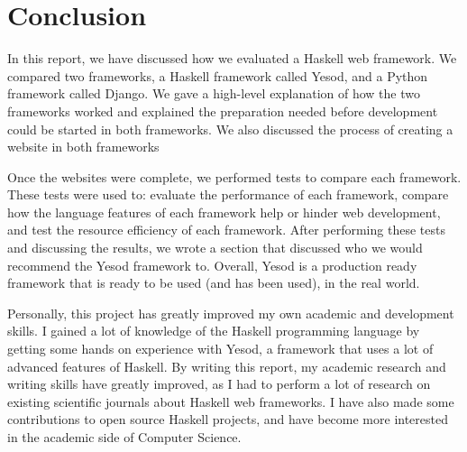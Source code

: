 \chapter{Conclusion}

In this report, we have discussed how we evaluated a
Haskell web framework. We compared two frameworks,
a Haskell framework called Yesod, and a Python
framework called Django. We gave a high-level explanation
of how the two frameworks worked and explained the preparation
needed before development could be started in both frameworks.
We also discussed the process of creating a website in
both frameworks

Once the websites were complete, we performed tests to compare
each framework. These tests were used to: evaluate the performance
of each framework, compare how the language features
of each framework help or hinder web development, and test
the resource efficiency of each framework. After performing
these tests and discussing the results, we wrote a section
that discussed who we would recommend the Yesod framework
to. Overall, Yesod is a production ready framework that is
ready to be used (and has been used), in the real world.

Personally, this project has greatly improved my own academic and
development skills. I gained a lot of knowledge of the Haskell
programming language by getting some hands on experience with
Yesod, a framework that uses a lot of advanced features of Haskell.
By writing this report, my academic
research and writing skills have greatly improved, as I had to
perform a lot of research on existing scientific journals about
Haskell web frameworks.
I have also made some contributions to open source Haskell projects, and
have become more interested in the academic side of Computer
Science.
